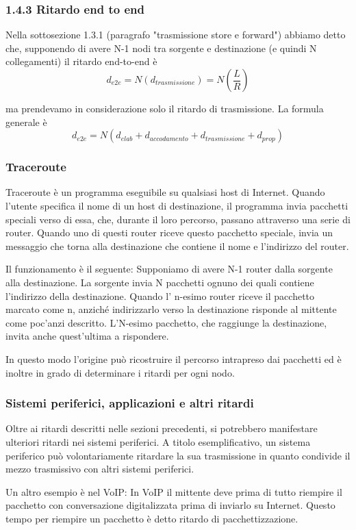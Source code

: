 \documentclass{book}
\begin{document}
\subsubsection{1.4.3 Ritardo end to end}
Nella sottosezione 1.3.1 (paragrafo "trasmissione store e forward") abbiamo detto che, supponendo di avere N-1 nodi tra sorgente e destinazione (e quindi N collegamenti) il ritardo end-to-end è
$$d_{e2e} = N(d_{trasmissione}) = N(\frac{L}{R})$$

ma prendevamo in considerazione solo il ritardo di trasmissione. La formula generale è 
$$d_{e2e} = N(d_{elab} + d_{accodamento} + d_{trasmissione} + d_{prop})$$

\subsubsection{Traceroute}
Traceroute è un programma eseguibile su qualsiasi host di Internet. Quando l'utente specifica il nome di un host di destinazione, il programma invia pacchetti speciali verso di essa, che, durante il loro percorso, passano attraverso una serie di router. Quando uno di questi router riceve questo pacchetto speciale, invia un messaggio che torna alla destinazione che contiene il nome e l'indirizzo del router.

Il funzionamento è il seguente: Supponiamo di avere N-1 router dalla sorgente alla destinazione. La sorgente invia N pacchetti ognuno dei quali contiene l'indirizzo della destinazione. Quando l' n-esimo router riceve il pacchetto marcato come n, anziché indirizzarlo verso la destinazione risponde al mittente come poc'anzi descritto. L'N-esimo pacchetto, che raggiunge la destinazione, invita anche quest'ultima a rispondere.

In questo modo l'origine può ricostruire il percorso intrapreso dai pacchetti ed è inoltre in grado di determinare i ritardi per ogni nodo.

\subsubsection{Sistemi periferici, applicazioni e altri ritardi}
Oltre ai ritardi descritti nelle sezioni precedenti, si potrebbero manifestare ulteriori ritardi nei sistemi periferici. A titolo esemplificativo, un sistema periferico può volontariamente ritardare la sua trasmissione in quanto condivide il mezzo trasmissivo con altri sistemi periferici.

Un altro esempio è nel VoIP: In VoIP il mittente deve prima di tutto riempire il pacchetto con conversazione digitalizzata prima di inviarlo su Internet. Questo tempo per riempire un pacchetto è detto ritardo di pacchettizzazione.
\end{document}
